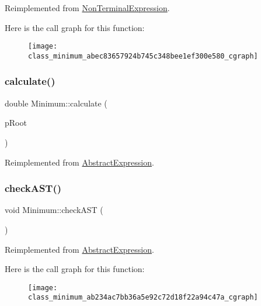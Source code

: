 Reimplemented from \mbox{\hyperlink{class_non_terminal_expression_aa65153b69523e01d86893f6d7b7fc480}{Non\+Terminal\+Expression}}.

Here is the call graph for this function\+:
\nopagebreak
\begin{figure}[H]
\begin{center}
\leavevmode
\texttt{[image: class\_minimum\_abec83657924b745c348bee1ef300e580\_cgraph]}
\end{center}
\end{figure}
\mbox{\label{class_minimum_a181a156021f98d15bd1aa6484ff587cc}} 
\subsubsection{\texorpdfstring{calculate()}{calculate()}}
{\footnotesize\ttfamily double Minimum\+::calculate (\begin{DoxyParamCaption}\item[{std\+::unique\+\_\+ptr$<$ \mbox{\hyperlink{class_abstract_expression}{Abstract\+Expression}} $>$ \&}]{p\+Root }\end{DoxyParamCaption})\hspace{0.3cm}{\ttfamily [virtual]}}



Reimplemented from \mbox{\hyperlink{class_abstract_expression_a1c9871ee669668c2eb9f1f1a7d6f5d32}{Abstract\+Expression}}.

\mbox{\label{class_minimum_ab234ac7bb36a5e92c72d18f22a94c47a}} 
\subsubsection{\texorpdfstring{checkAST()}{checkAST()}}
{\footnotesize\ttfamily void Minimum\+::check\+A\+ST (\begin{DoxyParamCaption}{ }\end{DoxyParamCaption})\hspace{0.3cm}{\ttfamily [virtual]}}



Reimplemented from \mbox{\hyperlink{class_abstract_expression_a703563fdf65d18ce4b7f2817e2ff4581}{Abstract\+Expression}}.

Here is the call graph for this function\+:
\nopagebreak
\begin{figure}[H]
\begin{center}
\leavevmode
\texttt{[image: class\_minimum\_ab234ac7bb36a5e92c72d18f22a94c47a\_cgraph]}
\end{center}
\end{figure}
\mbox{\label{class_minimum_a8a81bd6a451ad1ad38dd33a85e9d49cc}} 
